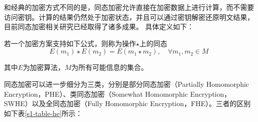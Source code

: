 和经典的加密方式不同的是，同态加密允许直接在加密数据上进行计算，而不需要访问密钥。计算的结果仍然处于加密状态，并且可以通过密钥解密还原明文结果，目前同态加密相关研究已经取得了诸多成果。
具体定义\cite{acar2018survey}如下：

\begin{definition}
	若一个加密方案支持如下公式，则称为操作$ \star $上的同态
	\begin{equation}
		E\left(m_1\right) \star E\left(m_2\right)=E\left(m_1 \star m_2\right), \quad \forall m_1, m_2 \in M
	\end{equation}

	其中$ E $为加密算法，$ M $为所有可能信息的集合。
\end{definition}

同态加密可以进一步细分为三类，分别是部分同态加密（Partially Homomorphic Encryption，PHE）、类同态加密（Somewhat Homomorphic Encryption，SWHE）以及全同态加密（Fully Homomorphic Encryption，FHE）。三者的区别如下表\ref{s1-table-he}所示：

\begin{table}[htbp]
	\renewcommand{\arraystretch}{1.3}
	\caption{同态加密方案对比}
	\label{s1-table-he}


\end{table}


